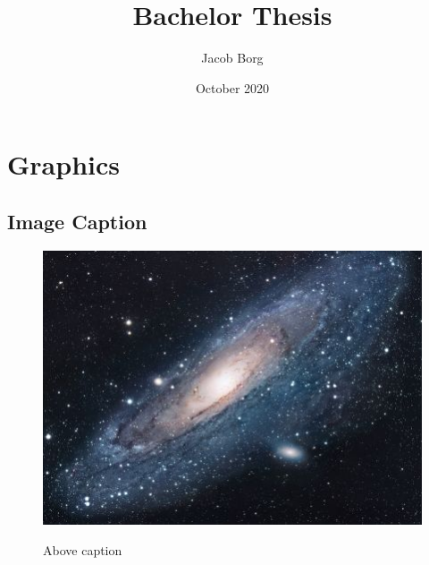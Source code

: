 \documentclass{article}
\title{Bachelor Thesis}
\author{Jacob Borg }
\date{October 2020}
\begin{document}
\maketitle
\thispagestyle{empty}
\clearpage

\tableofcontents
\clearpage

\section{Graphics}
\subsection{Image Caption}
\begin{figure}
    \centering
    \caption{Above caption}
    \includegraphics{universe.jpg}
    \label{fig:my_univers}
\end{figure}
\end{document}
